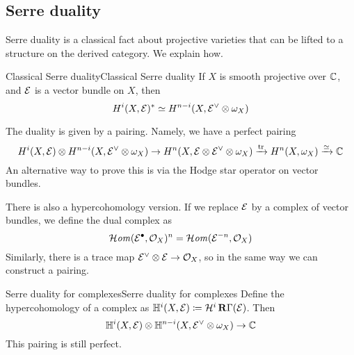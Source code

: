 \subsection{Serre duality}

Serre duality is a classical fact about projective varieties that can be lifted to a structure on the derived category. We explain how.

\begin{proposition}{Classical Serre duality}{Classical Serre duality}
    If $X$ is smooth projective over $\mathbb{C}$, and $\mathcal{E}$ is a vector bundle on $X$, then
    \begin{equation*}
        H^i(X,\mathcal{E})^* \simeq H^{n-i}(X,\mathcal{E}^\vee\otimes\omega_X)
    \end{equation*}
\end{proposition}

The duality is given by a pairing. Namely, we have a perfect pairing
\begin{equation*}
    H^i(X,\mathcal{E})\otimes H^{n-i}(X,\mathcal{E}^\vee\otimes\omega_X)
        \to H^n(X,\mathcal{E}\otimes\mathcal{E}^\vee\otimes\omega_X)
        \xrightarrow{\mathrm{tr}} H^n(X,\omega_X)
        \xrightarrow{\simeq} \mathbb{C}
\end{equation*}
An alternative way to prove this is via the Hodge star operator on vector bundles.

There is also a hypercohomology version. If we replace $\mathcal{E}$ by a complex of vector bundles, we define the dual complex as
\begin{equation*}
    \operatorname{\mathcal{H}\mathit{om}}(\mathcal{E}^\bullet,\mathcal{O}_X)^n = \operatorname{\mathcal{H}\mathit{om}}(\mathcal{E}^{-n},\mathcal{O}_X)
\end{equation*}
Similarly, there is a trace map $\mathcal{E}^\vee\otimes\mathcal{E}\to\mathcal{O}_X$, so in the same way we can construct a pairing.


\begin{proposition}{Serre duality for complexes}{Serre duality for complexes}
    Define the hypercohomology of a complex as $\mathbb{H}^i(X,\mathcal{E})\coloneqq\mathcal{H}^i\operatorname{\mathbf{R}\Gamma}(\mathcal{E})$. Then
    \begin{equation*}
        \mathbb{H}^i(X,\mathcal{E})\otimes\mathbb{H}^{n-i}(X,\mathcal{E}^\vee\otimes\omega_X)\to\mathbb{C}
    \end{equation*}
    This pairing is still perfect.
\end{proposition}

